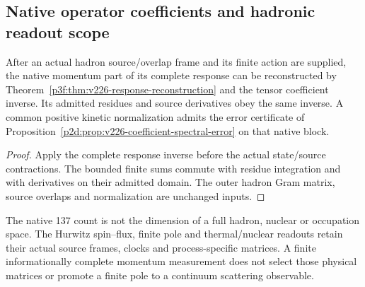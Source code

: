\documentclass[12pt,a4paper]{article}
\begin{document}
\subsection{Native operator coefficients and hadronic readout scope}
\label{p11:sec:v226-hadron-coefficients}
\begin{corollary}
\label{p11:cor:v226-hadron-coefficients}
After an actual hadron source/overlap frame and its finite action are supplied,
the native momentum part of its complete response can be reconstructed by
Theorem~\ref{p3f:thm:v226-response-reconstruction} and the tensor coefficient
inverse. Its admitted residues and source derivatives obey the same inverse.
A common positive kinetic normalization admits the error certificate of
Proposition~\ref{p2d:prop:v226-coefficient-spectral-error} on that native block.
\end{corollary}
\begin{proof}
Apply the complete response inverse before the actual state/source
contractions. The bounded finite sums commute with residue integration and
with derivatives on their admitted domain. The outer hadron Gram matrix,
source overlaps and normalization are unchanged inputs.
\end{proof}
The native 137 count is not the dimension of a full hadron, nuclear or
occupation space. The Hurwitz spin--flux, finite pole and thermal/nuclear
readouts retain their actual source frames, clocks and process-specific
matrices. A finite informationally complete momentum measurement does not
select those physical matrices or promote a finite pole to a continuum
scattering observable.



\end{document}

